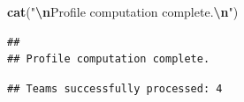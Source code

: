 \documentclass[
]{article}
\newenvironment{Shaded}{\begin{snugshade}}{\end{snugshade}}
\newcommand{\FunctionTok}[1]{\textcolor[rgb]{0.13,0.29,0.53}{\textbf{#1}}}
\newcommand{\NormalTok}[1]{#1}
\newcommand{\SpecialCharTok}[1]{\textcolor[rgb]{0.81,0.36,0.00}{\textbf{#1}}}
\newcommand{\StringTok}[1]{\textcolor[rgb]{0.31,0.60,0.02}{#1}}
\begin{document}
\begin{Shaded}
\begin{Highlighting}[]
\FunctionTok{cat}\NormalTok{(}\StringTok{"}\SpecialCharTok{\textbackslash{}n}\StringTok{Profile computation complete.}\SpecialCharTok{\textbackslash{}n}\StringTok{"}\NormalTok{)}
\end{Highlighting}
\end{Shaded}

\begin{verbatim}
## 
## Profile computation complete.
\end{verbatim}

\begin{Shaded}
\end{Shaded}

\begin{verbatim}
## Teams successfully processed: 4
\end{verbatim}
\end{document}
